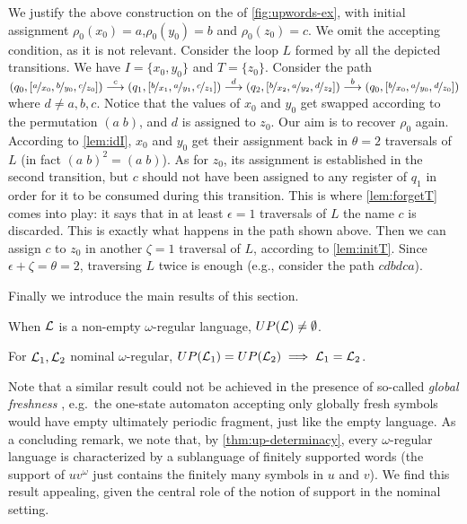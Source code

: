 \begin{example} We justify the above construction on the \hdma{} of \cref{fig:upwords-ex}, with initial assignment $\rho_0(x_0) = a$,$\rho_0(y_0) = b$ and $\rho_0(z_0) = c$. We omit the accepting condition, as it is not relevant. Consider the loop $L$ formed by all the depicted transitions.
We have $I = \{x_0,y_0\}$ and $T = \{z_0\}$. Consider the path
$	(q_0,[\nicefrac{a}{x_0},\nicefrac{b}{y_0},\nicefrac{c}{z_0}]) \overset{c}{\longrightarrow} (q_1,[\nicefrac{b}{x_1},\nicefrac{a}{y_1},\nicefrac{c}{z_1}]) \overset{d}{\longrightarrow} (q_2,[\nicefrac{b}{x_2},\nicefrac{a}{y_2},\nicefrac{d}{z_2}])
	\overset{b}{\longrightarrow} (q_0,[\nicefrac{b}{x_0},\nicefrac{a}{y_0},\nicefrac{d}{z_0}])$
%
where $d \neq a,b,c$. Notice that the values of $x_0$ and $y_0$ get swapped according to the permutation $(a \; b)$, and $d$ is assigned to $z_0$. Our aim is to recover $\rho_0$ again. According to \cref{lem:idI}, $x_0$ and $y_0$ get their assignment back in $\theta = 2$ traversals of $L$ (in fact $(a\; b)^2 = (a\; b)$). As for $z_0$, its assignment is established in the second transition, but $c$ should not have been assigned to any register of $q_1$ in order for it to be consumed during this transition. This is where \cref{lem:forgetT} comes into play: it says that in at least $\epsilon = 1$ traversals of $L$ the name $c$ is discarded. This is exactly what happens in the path shown above. Then we can assign $c$ to $z_0$ in another $\zeta = 1$ traversal of $L$, according to \cref{lem:initT}. Since $\epsilon + \zeta  = \theta = 2$, traversing $L$ twice is enough (e.g., consider the path $cdbdca$).
\end{example}
%
\noindent Finally we introduce the main results of this section.
%
\begin{theorem}
\label{thm:up-fragment}
When $\mathcal{L}$ is a non-empty $\omega$-regular language, $UP(\mathcal{L}) \neq \emptyset$.
\end{theorem}

\begin{theorem}
\label{thm:up-determinacy}
For $\mathcal{L}_1,\mathcal{L}_2$ nominal $\omega$-regular, $UP(\mathcal{L}_1) = UP(\mathcal{L}_2) \implies\mathcal{L}_1 = \mathcal{L}_2$.
\end{theorem}
% 
Note that a similar result could not be achieved in the presence of so-called \emph{global freshness} \cite{Tze11}, e.g.\ the one-state automaton accepting only globally fresh symbols would have empty ultimately periodic fragment, just like the empty language. As a concluding remark, we note that, by \cref{thm:up-determinacy}, every $\omega$-regular language is characterized by a sublanguage of finitely supported words (the support of $uv^\omega$ just contains the finitely many symbols in $u$ and $v$). We find this result appealing, given the central role of the notion of support in the nominal setting. 

